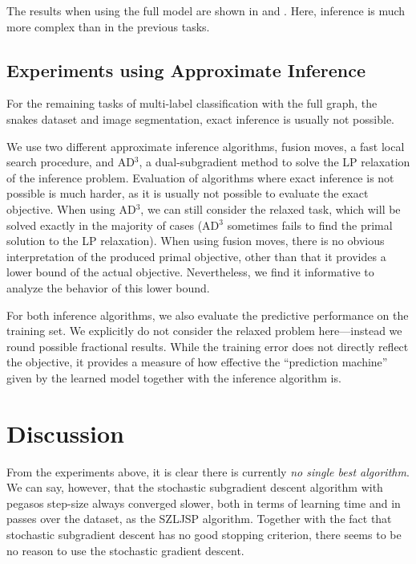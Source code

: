 The results when using the full model are shown in  and .
Here, inference is much more complex than in the previous tasks.

\subsection{Experiments using Approximate Inference}
For the remaining tasks of multi-label classification with the full graph, the
snakes dataset and image segmentation, exact inference is usually not possible.

We use two different approximate inference algorithms, fusion moves, a fast
local search procedure, and AD$^3$, a dual-subgradient method to solve the LP
relaxation of the inference problem.
Evaluation of algorithms where exact inference is not possible is much harder,
as it is usually not possible to evaluate the exact objective. When using AD$^3$,
we can still consider the relaxed task, which will be solved exactly in the
majority of cases (AD$^3$ sometimes fails to find the primal solution to the LP
relaxation). %
When using fusion moves, there is no obvious interpretation of the produced
primal objective, other than that it provides a lower bound of the actual
objective. Nevertheless, we find it informative to analyze the behavior of this lower bound.

For both inference algorithms, we also evaluate the predictive performance on
the training set.  We explicitly do not consider the relaxed problem
here---instead we round possible fractional results.
While the training error does not directly reflect the objective, it provides
a measure of how effective the ``prediction machine'' given by the learned model
together with the inference algorithm is.

\section{Discussion}
From the experiments above, it is clear there is currently \emph{no single best algorithm}.
We can say, however, that the stochastic subgradient descent algorithm with
pegasos step-size always converged slower, both in terms of learning time and
in passes over the dataset, as the SZLJSP algorithm.
Together with the fact that stochastic subgradient descent has no good stopping
criterion, there seems to be no reason to use the stochastic gradient descent.
